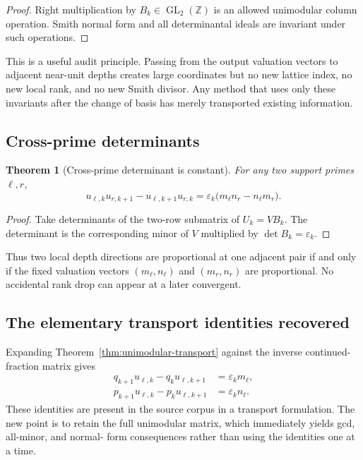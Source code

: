 \documentclass[11pt,oneside]{article}
\newtheorem{theorem}{Theorem}[section]
\theoremstyle{definition}
\theoremstyle{remark}
\newcommand{\Z}{\mathbb Z}
\newcommand{\eps}{\varepsilon}
\newcommand{\GL}{\operatorname{GL}}
\begin{document}
\begin{proof}
Right multiplication by $B_k\in\GL_2(\Z)$ is an allowed unimodular column operation.  Smith
normal form and all determinantal ideals are invariant under such operations.
\end{proof}

This is a useful audit principle.  Passing from the output valuation vectors to adjacent
near-unit depths creates large coordinates but no new lattice index, no new local rank, and
no new Smith divisor.  Any method that uses only these invariants after the change of basis
has merely transported existing information.

\subsection{Cross-prime determinants}

\begin{theorem}[Cross-prime determinant is constant]
\label{thm:cross-determinant}
For any two support primes $\ell,r$,
\begin{equation}
 u_{\ell,k}u_{r,k+1}-u_{\ell,k+1}u_{r,k}
 =\eps_k\bigl(m_\ell n_r-n_\ell m_r\bigr).
 \label{eq:cross-determinant}
\end{equation}
\end{theorem}

\begin{proof}
Take determinants of the two-row submatrix of $U_k=VB_k$.  The determinant is the
corresponding minor of $V$ multiplied by $\det B_k=\eps_k$.
\end{proof}

Thus two local depth directions are proportional at one adjacent pair if and only if the
fixed valuation vectors $(m_\ell,n_\ell)$ and $(m_r,n_r)$ are proportional.  No accidental
rank drop can appear at a later convergent.

\subsection{The elementary transport identities recovered}

Expanding Theorem~\ref{thm:unimodular-transport} against the inverse continued-fraction
matrix gives
\begin{align}
 q_{k+1}u_{\ell,k}-q_ku_{\ell,k+1}&=\eps_km_\ell,
 \label{eq:q-transport}\\
 p_{k+1}u_{\ell,k}-p_ku_{\ell,k+1}&=\eps_kn_\ell.
 \label{eq:p-transport}
\end{align}
These identities are present in the source corpus in a transport formulation.  The new point
is to retain the full unimodular matrix, which immediately yields gcd, all-minor, and normal-
form consequences rather than using the identities one at a time.
\end{document}

